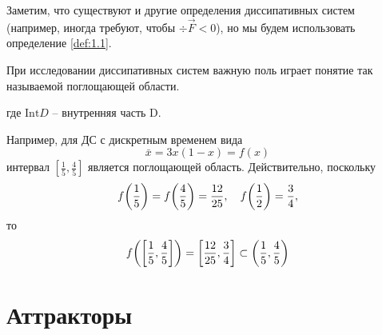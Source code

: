 
Заметим, что существуют и другие определения диссипативных систем (например, иногда требуют, чтобы $\div \vec F < 0$), но мы будем использовать определение \ref{def:1.1}. 

При исследовании диссипативных систем важную поль играет понятие так называемой поглощающей области.

где $\mathrm{Int} D$ -- внутренняя часть D.

Например, для ДС с дискретным временем вида
\begin{equation}
	\bar x = 3x(1-x)= f(x)
\end{equation}
интервал $[\frac15, \frac45]$ является поглощающей область. Действительно, поскольку 
\begin{equation}
	f\qty(\frac15)=f\qty(\frac45)=\frac{12}{25},\quad f\qty(\frac12)=\frac34,
\end{equation}
то 
\begin{equation}
	f\qty(\qty[\frac15,\frac45])= \qty[\frac{12}{25}, \frac34]\subset \qty(\frac15,\frac45)
\end{equation}

\section{Аттракторы} %

